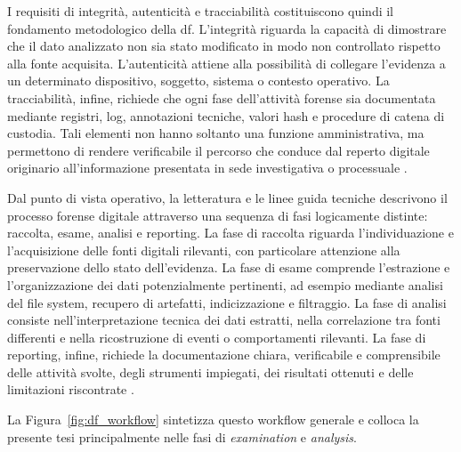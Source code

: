 I requisiti di integrità, autenticità e tracciabilità costituiscono quindi il fondamento metodologico della \gls{df}. L'integrità riguarda la capacità di dimostrare che il dato analizzato non sia stato modificato in modo non controllato rispetto alla fonte acquisita. L'autenticità attiene alla possibilità di collegare l'evidenza a un determinato dispositivo, soggetto, sistema o contesto operativo. La tracciabilità, infine, richiede che ogni fase dell'attività forense sia documentata mediante registri, log, annotazioni tecniche, valori hash e procedure di catena di custodia. Tali elementi non hanno soltanto una funzione amministrativa, ma permettono di rendere verificabile il percorso che conduce dal reperto digitale originario all'informazione presentata in sede investigativa o processuale \cite{iso27037,enfsi2022,swgde_guidelines,acpo_guidelines}.

Dal punto di vista operativo, la letteratura e le linee guida tecniche descrivono il processo forense digitale attraverso una sequenza di fasi logicamente distinte: raccolta, esame, analisi e reporting. La fase di raccolta riguarda l'individuazione e l'acquisizione delle fonti digitali rilevanti, con particolare attenzione alla preservazione dello stato dell'evidenza. La fase di esame comprende l'estrazione e l'organizzazione dei dati potenzialmente pertinenti, ad esempio mediante analisi del file system, recupero di artefatti, indicizzazione e filtraggio. La fase di analisi consiste nell'interpretazione tecnica dei dati estratti, nella correlazione tra fonti differenti e nella ricostruzione di eventi o comportamenti rilevanti. La fase di reporting, infine, richiede la documentazione chiara, verificabile e comprensibile delle attività svolte, degli strumenti impiegati, dei risultati ottenuti e delle limitazioni riscontrate \cite{reith2002examining,nist2006guide,casey2011digital,carrier2005filesystem}.

La Figura~\ref{fig:df_workflow} sintetizza questo workflow generale e colloca la presente tesi principalmente nelle fasi di \textit{examination} e \textit{analysis}.

